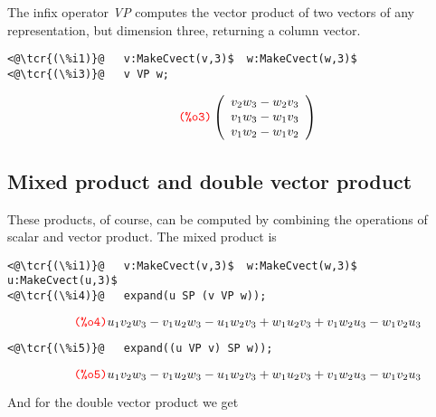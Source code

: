 \documentclass[../Maxima_Workbook.tex]{subfiles}
\begin{document}
\lzz {} \hfill {}

\lz The infix operator \emph{VP} computes the vector product of two vectors of any representation, but dimension three, returning a column vector.

\begin{small}
\color{blue}
\begin{lstlisting}
<@\tcr{(\%i1)}@   v:MakeCvect(v,3)$  w:MakeCvect(w,3)$
<@\tcr{(\%i3)}@   v VP w;
\end{lstlisting}
\vspace{-5mm} \[\tag*{\tcr{\ttfamily (\%o3)}} \left( \begin{array} {c} v_2 w_3 - w_2 v_3 \\ v_1 w_3 - w_1 v_3 \\ v_1 w_2 - w_1 v_2 \end{array} \right) \]
\color{black}
\end{small}

\vspace{-6mm} \subsection{Mixed product and double vector product}

These products, of course, can be computed by combining the operations of scalar and vector product. The mixed product is

\begin{small}
\color{blue}
\begin{lstlisting}
<@\tcr{(\%i1)}@   v:MakeCvect(v,3)$  w:MakeCvect(w,3)$  u:MakeCvect(u,3)$
<@\tcr{(\%i4)}@   expand(u SP (v VP w));
\end{lstlisting}
\vspace{-4mm} \[\tag*{\tcr{\ttfamily (\%o4)}} u_1v_2w_3-v_1u_2w_3-u_1w_2v_3+w_1u_2v_3+v_1w_2u_3-w_1v_2u_3 \]
\vspace{-8mm} \begin{lstlisting}
<@\tcr{(\%i5)}@   expand((u VP v) SP w));
\end{lstlisting}
\vspace{-4mm} \[\tag*{\tcr{\ttfamily (\%o5)}} u_1v_2w_3-v_1u_2w_3-u_1w_2v_3+w_1u_2v_3+v_1w_2u_3-w_1v_2u_3 \]
\color{black}
\end{small}

\vspace{-4mm} And for the double vector product we get
\end{document}
